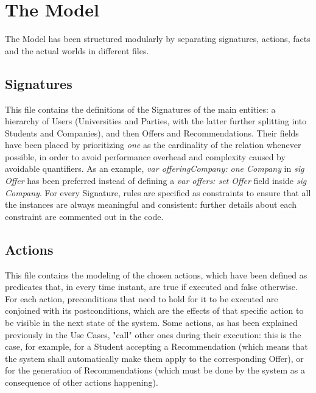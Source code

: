 \section{The Model}
\label{subsec:The Model}%

The Model has been structured modularly by separating signatures, actions, facts and the actual worlds in different files.

\subsection{Signatures}

This file contains the definitions of the Signatures of the main entities: a hierarchy of Users (Universities and Parties, with the latter further splitting into Students and Companies), and then Offers and Recommendations. Their fields have been placed by prioritizing \textit{one} as the cardinality of the relation whenever possible, in order to avoid performance overhead and complexity caused by avoidable quantifiers. As an example, \textit{var offeringCompany: one Company} in \textit{sig Offer} has been preferred instead of defining a \textit{var offers: set Offer} field inside \textit{sig Company}.
For every Signature, rules are specified as constraints to ensure that all the instances are always meaningful and consistent: further details about each constraint are commented out in the code.



\subsection{Actions}

This file contains the modeling of the chosen actions, which have been defined as predicates that, in every time instant, are true if executed and false otherwise. For each action, preconditions that need to hold for it to be executed are conjoined with its postconditions, which are the effects of that specific action to be visible in the next state of the system. Some actions, as has been explained previously in the Use Cases, "call" other ones during their execution: this is the case, for example, for a Student accepting a Recommendation (which means that the system shall automatically make them apply to the corresponding Offer), or for the generation of Recommendations (which must be done by the system as a consequence of other actions happening).

